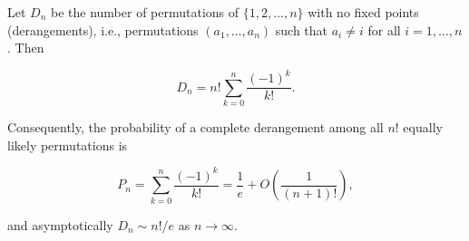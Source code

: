 Let $D_n$ be the number of permutations of $\{1, 2, \ldots, n\}$ with no fixed points (derangements), i.e., permutations $(a_1, \ldots, a_n)$ such that $a_i \neq i$ for all $i = 1, \ldots, n$. Then

$$D_n = n! \sum_{k=0}^{n} \frac{(-1)^k}{k!}.$$

Consequently, the probability of a complete derangement among all $n!$ equally likely permutations is

$$P_n = \sum_{k=0}^{n} \frac{(-1)^k}{k!} = \frac{1}{e} + O\left(\frac{1}{(n+1)!}\right),$$

and asymptotically $D_n \sim n!/e$ as $n \to \infty$.
